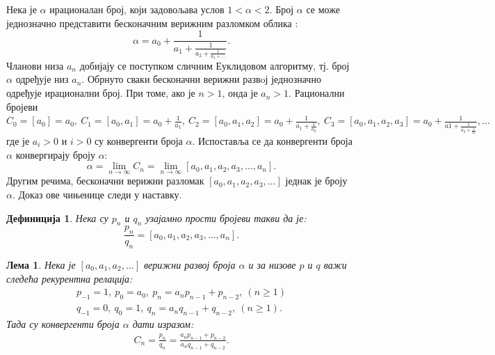 \documentclass[a4paper]{article}
\newtheorem{lemma}{Лема}
\newtheorem{definition}{Дефиниција}
\begin{document}
Нека је $ \alpha $ ирационалан број, који задовољава услов $ 1 < \alpha < 2 $. Број $ \alpha $ се може једнозначно представити бесконачним верижним разломком облика \cite{hardy2008introduction, olds1963continued}:
\begin{displaymath}
	\alpha = a_{0} + \frac{1}{a_{1} + \frac{1}{a_{2} + \frac{1}{a_{3} + \ldots}}}.
\end{displaymath}
Чланови низа $ a_{n} $ добијају се поступком сличним Еуклидовом алгоритму, тј. број $ \alpha $ одређује низ $ a_{n} $. Обрнуто сваки бесконачни верижни развoј једнозначно одређује ирационални број. При томе, ако је $ n > 1 $, онда је $ a_{n} > 1 $.
Рационални бројеви $ C_{0} = [a_{0}] = a_{0},\ C_{1} = [a_{0}, a_{1}] = a_{0} + \frac{1}{a_{1}},\ C_{2} = [a_{0}, a_{1}, a_{2}] = a_{0} + \frac{1}{a_{1} + \frac{1}{a_{2}}},\ C_{3} = [a_{0}, a_{1}, a_{2}, a_{3}] = a_{0} + \frac{1}{a{1} + \frac{1}{a_{2} + \frac{1}{a_{3}}}}, \ldots $ где је $ a_{i} > 0 $ и $ i > 0 $ су конвергенти броја $ \alpha $.
Испоставља се да конвергенти броја $ \alpha $ конвергирају броју $ \alpha $:
\begin{displaymath}
	\alpha = \lim\limits_{n \rightarrow \infty} C_{n} = \lim\limits_{n \rightarrow \infty} [a_{0}, a_{1}, a_{2}, a_{3}, \ldots, a_{n}].
\end{displaymath}
Другим речима, бесконачни верижни разломак $ [a_{0}, a_{1}, a_{2}, a_{3}, \ldots] $ једнак је броју $ \alpha $. Доказ ове чињенице следи у наставку.

\begin{definition}
	\label{def:p_q_nizovi}
	Нека су $ p_{n} $ и $ q_{n} $ узајамно прости бројеви такви да је:
	\begin{displaymath}
		\frac{p_{n}}{q_{n}} = [a_{0}, a_{1}, a_{2}, a_{3}, \ldots, a_{n}].
	\end{displaymath}	
\end{definition}

\begin{lemma}
	\label{lemmma:p_q_nizovi}
	Нека је $ [a_{0}, a_{1}, a_{2}, \ldots] $ верижни развој броја $ \alpha $ и за низове $ p $ и $ q $ важи следећа рекурентна релација:
	\begin{eqnarray}
		p_{-1} = 1,\ p_{0} = a_{0},\ p_{n} = a_{n}p_{n-1} + p_{n-2},\ (n \geq 1 )\\
		q_{-1} = 0,\ q_{0} = 1,\ q_{n} = a_{n}q_{n-1} + q_{n-2},\ (n \geq 1 ).
	\end{eqnarray}
	Тада су конвергенти броја $ \alpha $ дати изразом:	
	\begin{eqnarray}
		C_{n} = \frac{p_{n}}{q_{n}} = \frac{a_{n}p_{n-1} + p_{n-2}}{a_{n}q_{n-1} + q_{n-2}}.
	\end{eqnarray}
\end{lemma}
\end{document}
